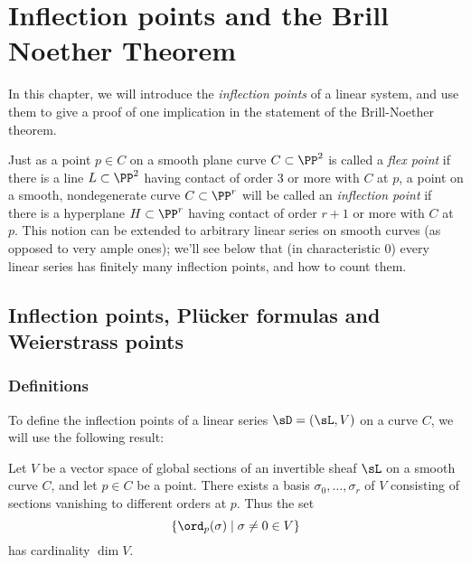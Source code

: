 

\chapter{Inflection points and the Brill Noether Theorem}\label{inflections chapter}
\label{InflectionsChapter}


In this chapter, we will introduce the \emph{inflection points} of a linear system, and use them to give a proof of one implication in the statement of the Brill-Noether theorem.

Just as a point $p \in C$ on a smooth plane curve $C \subset \PP^2$ is called a \emph{flex point} if there is a line $L \subset \PP^2$ having contact of order 3 or more with $C$ at $p$, a point on a smooth, nondegenerate curve $C \subset \PP^r$ will be called an \emph{inflection point} if there is a hyperplane $H \subset \PP^r$ having contact of order $r+1$ or more with $C$ at $p$. This notion can be extended to arbitrary linear series on smooth curves (as opposed to very ample ones); we'll see below that (in characteristic 0) every linear series has finitely many inflection points, and how to count them.


\section{Inflection points,  Pl\"ucker formulas and Weierstrass points}

\subsection{Definitions}
To define the inflection points of a linear series $\sD = (\sL, V)$ on a curve $C$, we will use the following result:

\begin{proposition}\label{vanishing sequence} Let $V$ be a vector space of global sections of an invertible sheaf $\sL$ on a smooth curve $C$, and let $p \in C$ be a point. There exists a basis $\sigma_0, \dots, \sigma_r$ of $V$ consisting of sections vanishing to different orders at $p$. Thus the set
$$
\{ \ord_p(\sigma) \mid \sigma \neq 0 \in V \}
$$
 has cardinality $\dim V$.
\end{proposition}

